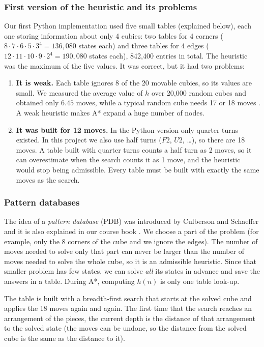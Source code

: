 \subsubsection{First version of the heuristic and its problems}
Our first Python implementation used five small tables (explained below), each one storing information about only 4 cubies: two tables for 4 corners ($8\cdot7\cdot6\cdot5\cdot3^4 = 136{,}080$ states each) and three tables for 4 edges ($12\cdot11\cdot10\cdot9\cdot2^4 = 190{,}080$ states each), 842,400 entries in total. The heuristic was the maximum of the five values. It was correct, but it had two problems:
\begin{enumerate}
    \item \textbf{It is weak.} Each table ignores 8 of the 20 movable cubies, so its values are small. We measured the average value of $h$ over 20,000 random cubes and obtained only $6.45$ moves, while a typical random cube needs 17 or 18 moves \cite{cube20}. A weak heuristic makes A* expand a huge number of nodes.
    \item \textbf{It was built for 12 moves.} In the Python version only quarter turns existed. In this project we also use half turns ($F2$, $U2$, \dots), so there are 18 moves. A table built with quarter turns counts a half turn as 2 moves, so it can overestimate when the search counts it as 1 move, and the heuristic would stop being admissible. Every table must be built with exactly the same moves as the search.
\end{enumerate}

\subsubsection{Pattern databases}
The idea of a \textit{pattern database} (PDB) was introduced by Culberson and Schaeffer \cite{culberson1998} and it is also explained in our course book \cite[p.~106]{aima3}. We choose a part of the problem (for example, only the 8 corners of the cube and we ignore the edges). The number of moves needed to solve only that part can never be larger than the number of moves needed to solve the whole cube, so it is an admissible heuristic. Since that smaller problem has few states, we can solve \emph{all} its states in advance and save the answers in a table. During A*, computing $h(n)$ is only one table look-up.

The table is built with a breadth-first search that starts at the solved cube and applies the 18 moves again and again. The first time that the search reaches an arrangement of the pieces, the current depth is the distance of that arrangement to the solved state (the moves can be undone, so the distance from the solved cube is the same as the distance to it).

